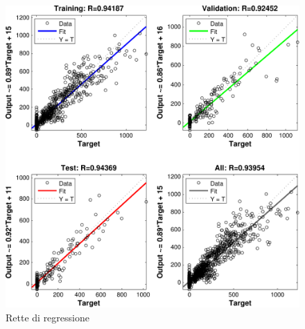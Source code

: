 \begin{figure}
  \centering
  \includegraphics[scale=0.7]{images/neural_net/regressions.pdf}
  \caption{Rette di regressione}
\end{figure}
